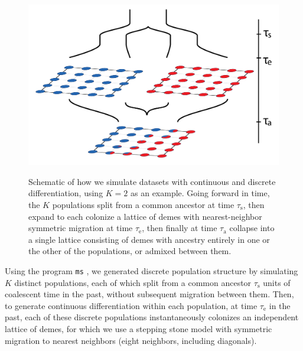 \documentclass[10pt,letterpaper]{article}
\begin{document}
\begin{figure}[!ht]
	\centering
		{\includegraphics[width=\textwidth]{figs/sims/sim_setup.png}}
		\caption{Schematic of how we simulate datasets with continuous and discrete differentiation, using $K=2$ as an example.  
			    Going forward in time, the $K$ populations split from a common ancestor at time $\tau_{\text{s}}$,
			    then expand to each  colonize a lattice of demes with nearest-neighbor symmetric migration at time $\tau_{\text{e}}$,
			    then finally at time $\tau_{\text{a}}$ collapse into a single lattice consisting of demes 
			    with ancestry entirely in one or the other of the populations,
			    or admixed between them.
			    }\label{sim_setup}
\end{figure}

Using the program \texttt{ms} \cite{Hudson2002}, 
we generated discrete population structure by simulating $K$ distinct populations,
each of which split from a common ancestor $\tau_{\text{s}}$ units of coalescent time in the past,
without subsequent migration between them.
Then, to generate continuous differentiation within each population,
at time $\tau_{\text{e}}$ in the past,
each of these discrete populations instantaneously colonizes an
independent lattice of demes,
for which we use a stepping stone model with symmetric migration 
to nearest neighbors (eight neighbors, including diagonals).
\end{document}
